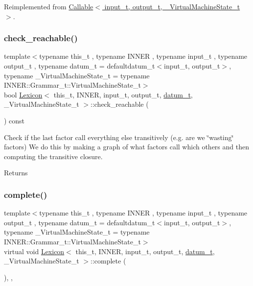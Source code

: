 Reimplemented from \hyperlink{class_callable_af10dbf87425f03b7153f8ec230bf9116}{Callable$<$ input\+\_\+t, output\+\_\+t, \+\_\+\+Virtual\+Machine\+State\+\_\+t $>$}.

\mbox{\label{class_lexicon_a4d2056453bb4fdd179c0e961fb071aea}} 
\subsubsection{\texorpdfstring{check\+\_\+reachable()}{check\_reachable()}}
{\footnotesize\ttfamily template$<$typename this\+\_\+t , typename I\+N\+N\+ER , typename input\+\_\+t , typename output\+\_\+t , typename datum\+\_\+t  = defaultdatum\+\_\+t$<$input\+\_\+t, output\+\_\+t$>$, typename \+\_\+\+Virtual\+Machine\+State\+\_\+t  = typename I\+N\+N\+E\+R\+::\+Grammar\+\_\+t\+::\+Virtual\+Machine\+State\+\_\+t$>$ \\
bool \hyperlink{class_lexicon}{Lexicon}$<$ this\+\_\+t, I\+N\+N\+ER, input\+\_\+t, output\+\_\+t, \hyperlink{class_bayesable_a9f1a6c0cd7855550fa10b1a8f13a5867}{datum\+\_\+t}, \+\_\+\+Virtual\+Machine\+State\+\_\+t $>$\+::check\+\_\+reachable (\begin{DoxyParamCaption}{ }\end{DoxyParamCaption}) const\hspace{0.3cm}{\ttfamily [inline]}}

Check if the last factor call everything else transitively (e.\+g. are we \char`\"{}wasting\char`\"{} factors) We do this by making a graph of what factors call which others and then computing the transitive closure. \begin{DoxyReturn}{Returns}

\end{DoxyReturn}
\mbox{\label{class_lexicon_a881ff3280b54f56b88d2511e319b5a4d}} 
\subsubsection{\texorpdfstring{complete()}{complete()}}
{\footnotesize\ttfamily template$<$typename this\+\_\+t , typename I\+N\+N\+ER , typename input\+\_\+t , typename output\+\_\+t , typename datum\+\_\+t  = defaultdatum\+\_\+t$<$input\+\_\+t, output\+\_\+t$>$, typename \+\_\+\+Virtual\+Machine\+State\+\_\+t  = typename I\+N\+N\+E\+R\+::\+Grammar\+\_\+t\+::\+Virtual\+Machine\+State\+\_\+t$>$ \\
virtual void \hyperlink{class_lexicon}{Lexicon}$<$ this\+\_\+t, I\+N\+N\+ER, input\+\_\+t, output\+\_\+t, \hyperlink{class_bayesable_a9f1a6c0cd7855550fa10b1a8f13a5867}{datum\+\_\+t}, \+\_\+\+Virtual\+Machine\+State\+\_\+t $>$\+::complete (\begin{DoxyParamCaption}{ }\end{DoxyParamCaption})\hspace{0.3cm}{\ttfamily [inline]}, {\ttfamily [override]}, {\ttfamily [virtual]}}



